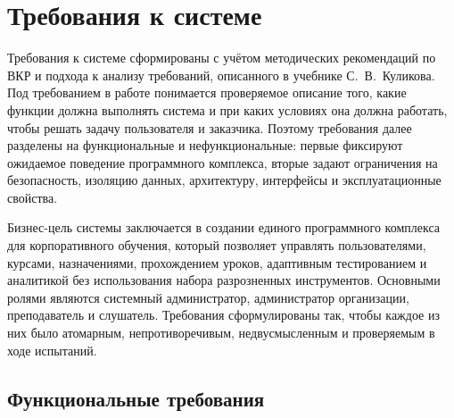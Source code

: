 \section{Требования к системе}

Требования к системе сформированы с учётом методических рекомендаций по ВКР и подхода к анализу требований, описанного в учебнике С.~В.~Куликова. Под требованием в работе понимается проверяемое описание того, какие функции должна выполнять система и при каких условиях она должна работать, чтобы решать задачу пользователя и заказчика\cite{metodichka_vkr_ikt_2021,kulikov_testing_2024}. Поэтому требования далее разделены на функциональные и нефункциональные: первые фиксируют ожидаемое поведение программного комплекса, вторые задают ограничения на безопасность, изоляцию данных, архитектуру, интерфейсы и эксплуатационные свойства.

Бизнес-цель системы заключается в создании единого программного комплекса для корпоративного обучения, который позволяет управлять пользователями, курсами, назначениями, прохождением уроков, адаптивным тестированием и аналитикой без использования набора разрозненных инструментов. Основными ролями являются системный администратор, администратор организации, преподаватель и слушатель. Требования сформулированы так, чтобы каждое из них было атомарным, непротиворечивым, недвусмысленным и проверяемым в ходе испытаний\cite{kulikov_testing_2024}.

\subsection{Функциональные требования}

